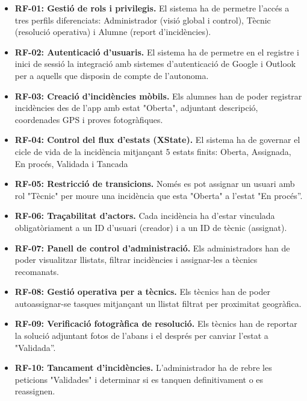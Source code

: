 \begin{itemize}
	\item \textbf{RF-01: Gestió de rols i privilegis. }
	El sistema ha de permetre l'accés a tres perfils diferenciats: Administrador (visió global i control), Tècnic (resolució operativa) i Alumne (report d'incidències).
	
	\item \textbf{RF-02: Autenticació d'usuaris.} 
	El sistema ha de permetre en el registre i inici de sessió la integració amb sistemes d'autenticació de Google i Outlook per a aquells que disposin de compte de l'autonoma. 
	
	\item \textbf{RF-03: Creació d'incidències mòbils. }
	Els alumnes han de poder registrar incidències des de l'app amb estat "Oberta", adjuntant descripció, coordenades GPS i proves fotogràfiques.
	
	\item \textbf{RF-04: Control del flux d'estats (XState).} 
	El sistema ha de governar el cicle de vida de la incidència mitjançant 5 estats finits: Oberta, Assignada, En procés, Validada i Tancada 
	
	\item \textbf{RF-05: Restricció de transicions.} 
	Només es pot assignar un usuari amb rol "Tècnic" per moure una incidència que esta "Oberta" a l'estat "En procés”. 
	
	\item \textbf{RF-06: Traçabilitat d'actors.} 
	Cada incidència ha d'estar vinculada obligatòriament a un ID d'usuari (creador) i a un ID de tècnic (assignat). 
	
	\item \textbf{RF-07: Panell de control d'administració.} 
	Els administradors han de poder visualitzar llistats, filtrar incidències i assignar-les a tècnics recomanats.
	
	\item \textbf{RF-08: Gestió operativa per a tècnics.} 
	Els tècnics han de poder autoassignar-se tasques mitjançant un llistat filtrat per proximitat geogràfica. 
	
	\item \textbf{RF-09: Verificació fotogràfica de resolució.} 
	Els tècnics han de reportar la solució adjuntant fotos de l'abans i el després per canviar l'estat a "Validada”. 
	
	\item \textbf{RF-10: Tancament d'incidències.} 
	L'administrador ha de rebre les peticions  "Validades" i determinar si es tanquen definitivament o es reassignen. 
	

\end{itemize}
